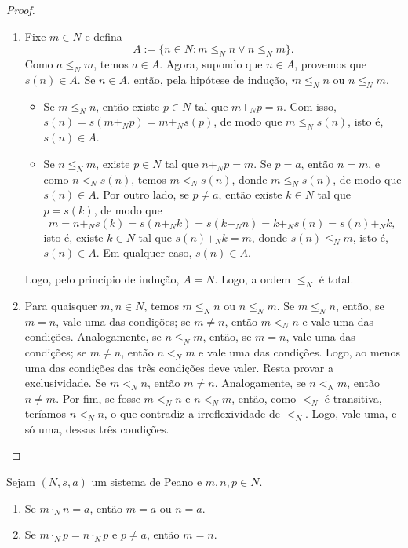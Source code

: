 \begin{proof}
    \leavevmode
        \begin{enumerate}[leftmargin=*, align=left, label=\textbf{(\alph*)}]
            \item Fixe $m \in N$ e defina
                \[
                    A := \{n \in N : m \leq_N n \lor n \leq_N m\}.
                \]
            Como $a \leq_N m$, temos $a \in A$. Agora, supondo que $n \in A$, provemos que $s(n) \in A$. Se $n \in A$, então, pela hipótese de indução, $m \leq_N n$ ou $n \leq_N m$.
                \begin{itemize}
                    \item Se $m \leq_N n$, então existe $p \in N$ tal que $m +_N p = n$. Com isso, $s(n) = s(m +_N p) = m +_N s(p)$, de modo que $m \leq_N s(n)$, isto é, $s(n) \in A$.
                    \item Se $n \leq_N m$, existe $p \in N$ tal que $n +_N p = m$. Se $p=a$, então $n=m$, e como $n <_N s(n)$, temos $m <_N s(n)$, donde $m \leq_N s(n)$, de modo que $s(n) \in A$. Por outro lado, se $p \neq a$, então existe $k \in N$ tal que $p = s(k)$, de modo que
                        \[
                            m = n +_N s(k) = s(n +_N k) = s(k +_N n) = k +_N s(n) = s(n) +_N k,
                        \]
                    isto é, existe $k \in N$ tal que $s(n) +_N k = m$, donde $s(n) \leq_N m$, isto é, $s(n) \in A$. Em qualquer caso, $s(n) \in A$.
                \end{itemize}
            Logo, pelo princípio de indução, $A = N$. Logo, a ordem $\leq_N$ é total. \blackproof
            \item Para quaisquer $m,n \in N$, temos $m \leq_N n$ ou $n \leq_N m$. Se $m \leq_N n$, então, se $m=n$, vale uma das condições; se $m \neq n$, então $m <_N n$ e vale uma das condições. Analogamente, se $n \leq_N m$, então, se $m=n$, vale uma das condições; se $m \neq n$, então $n <_N m$ e vale uma das condições. Logo, ao menos uma das condições das três condições deve valer. Resta provar a exclusividade. Se $m <_N n$, então $m \neq n$. Analogamente, se $n <_N m$, então $n \neq m$. Por fim, se fosse $m <_N n$ e $n <_N m$, então, como $<_N$ é transitiva, teríamos $n < _N n$, o que contradiz a irreflexividade de $<_N$. Logo, vale uma, e só uma, dessas três condições. \blackproof
        \end{enumerate}
\end{proof}

\begin{corollary}
    Sejam $(N,s,a)$ um sistema de Peano e $m,n,p \in N$.
        \begin{enumerate}[leftmargin=*, align=left, label=\textbf{(\alph*)}]
            \item Se $m \cdot_N n = a$, então $m = a$ ou $n=a$.
            \item Se $m \cdot_N p = n \cdot_N p$ e $p \neq a$, então $m=n$.
        \end{enumerate}
\end{corollary}

